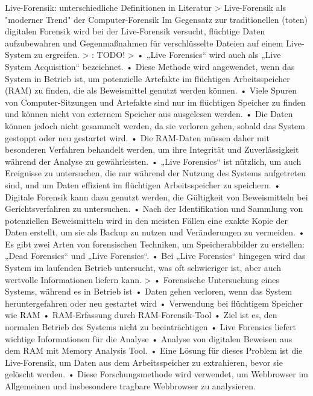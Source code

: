 Live-Forensik: unterschiedliche Definitionen in Literatur
	> Live-Forensik als "moderner Trend" der Computer-Forensik \cite{Gupta.2013}
		Im Gegensatz zur traditionellen (toten) digitalen Forensik wird bei der Live-Forensik versucht, flüchtige Daten aufzubewahren und Gegenmaßnahmen für verschlüsselte Dateien auf einem Live-System zu ergreifen.
	> \cite{Hassan.2019}: TODO!
	> \cite{Izzati.2022}
		•	„Live Forensics“ wird auch als „Live System Acquisition“ bezeichnet.
		•	Diese Methode wird angewendet, wenn das System in Betrieb ist, um potenzielle Artefakte im flüchtigen Arbeitsspeicher (RAM) zu finden, die als Beweismittel genutzt werden können.
		•	Viele Spuren von Computer-Sitzungen und Artefakte sind nur im flüchtigen Speicher zu finden und können nicht von externem Speicher aus ausgelesen werden.
		•	Die Daten können jedoch nicht gesammelt werden, da sie verloren gehen, sobald das System gestoppt oder neu gestartet wird.
		•	Die RAM-Daten müssen daher mit besonderen Verfahren behandelt werden, um ihre Integrität und Zuverlässigkeit während der Analyse zu gewährleisten.
		•	„Live Forensics“ ist nützlich, um auch Ereignisse zu untersuchen, die nur während der Nutzung des Systems aufgetreten sind, und um Daten effizient im flüchtigen Arbeitsspeicher zu speichern.	
		•	Digitale Forensik kann dazu genutzt werden, die Gültigkeit von Beweismitteln bei Gerichtsverfahren zu untersuchen.
		•	Nach der Identifikation und Sammlung von potenziellen Beweismitteln wird in den meisten Fällen eine exakte Kopie der Daten erstellt, um sie als Backup zu nutzen und Veränderungen zu vermeiden.
		•	Es gibt zwei Arten von forensischen Techniken, um Speicherabbilder zu erstellen: „Dead Forensics“ und „Live Forensics“.
		•	Bei „Live Forensics“ hingegen wird das System im laufenden Betrieb untersucht, was oft schwieriger ist, aber auch wertvolle Informationen liefern kann.
	> \cite{Rochmadi.2017}
		•	Forensische Untersuchung eines Systems, während es in Betrieb ist
		•	Daten gehen verloren, wenn das System heruntergefahren oder neu gestartet wird
		•	Verwendung bei flüchtigem Speicher wie RAM
		•	RAM-Erfassung durch RAM-Forensik-Tool
		•	Ziel ist es, den normalen Betrieb des Systems nicht zu beeinträchtigen
		•	Live Forensics liefert wichtige Informationen für die Analyse
		•	Analyse von digitalen Beweisen aus dem RAM mit Memory Analysis Tool.
		•	Eine Lösung für dieses Problem ist die Live-Forensik, um Daten aus dem Arbeitsspeicher zu extrahieren, bevor sie gelöscht werden.
		•	Diese Forschungsmethode wird verwendet, um Webbrowser im Allgemeinen und insbesondere tragbare Webbrowser zu analysieren.

